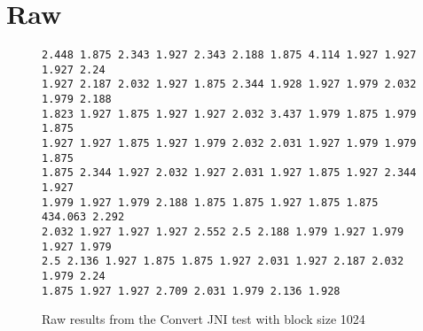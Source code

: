 %         
%         
%         
%         
%         
%         

\section{Raw}
\begin{figure}[H]
    \begin{verbatim}
2.448 1.875 2.343 1.927 2.343 2.188 1.875 4.114 1.927 1.927 1.927 2.24
1.927 2.187 2.032 1.927 1.875 2.344 1.928 1.927 1.979 2.032 1.979 2.188
1.823 1.927 1.875 1.927 1.927 2.032 3.437 1.979 1.875 1.979 1.875
1.927 1.927 1.875 1.927 1.979 2.032 2.031 1.927 1.979 1.979 1.875
1.875 2.344 1.927 2.032 1.927 2.031 1.927 1.875 1.927 2.344 1.927
1.979 1.927 1.979 2.188 1.875 1.875 1.927 1.875 1.875 434.063 2.292
2.032 1.927 1.927 1.927 2.552 2.5 2.188 1.979 1.927 1.979 1.927 1.979
2.5 2.136 1.927 1.875 1.875 1.927 2.031 1.927 2.187 2.032 1.979 2.24
1.875 1.927 1.927 2.709 2.031 1.979 2.136 1.928 
    \end{verbatim}
    \caption{Raw results from the Convert JNI test with block size 1024}
    \label{fig:raw:jni:convert:1024}
\end{figure}

